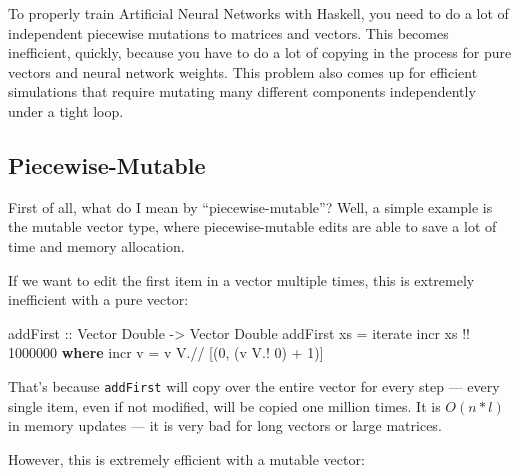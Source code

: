 \documentclass[]{article}
\newenvironment{Shaded}{}{}
\newcommand{\DataTypeTok}[1]{\textcolor[rgb]{0.56,0.13,0.00}{#1}}
\newcommand{\DecValTok}[1]{\textcolor[rgb]{0.25,0.63,0.44}{#1}}
\newcommand{\FunctionTok}[1]{\textcolor[rgb]{0.02,0.16,0.49}{#1}}
\newcommand{\KeywordTok}[1]{\textcolor[rgb]{0.00,0.44,0.13}{\textbf{#1}}}
\newcommand{\NormalTok}[1]{#1}
\newcommand{\OperatorTok}[1]{\textcolor[rgb]{0.40,0.40,0.40}{#1}}
\newcommand{\OtherTok}[1]{\textcolor[rgb]{0.00,0.44,0.13}{#1}}
\begin{document}
To properly train Artificial Neural Networks with Haskell, you need to do a lot
of independent piecewise mutations to matrices and vectors. This becomes
inefficient, quickly, because you have to do a lot of copying in the process for
pure vectors and neural network weights. This problem also comes up for
efficient simulations that require mutating many different components
independently under a tight loop.

\hypertarget{piecewise-mutable}{%
\subsection{Piecewise-Mutable}\label{piecewise-mutable}}

First of all, what do I mean by ``piecewise-mutable''? Well, a simple example is
the mutable vector type, where piecewise-mutable edits are able to save a lot of
time and memory allocation.

If we want to edit the first item in a vector multiple times, this is extremely
inefficient with a pure vector:

\begin{Shaded}
\begin{Highlighting}[]
\OtherTok{addFirst ::} \DataTypeTok{Vector} \DataTypeTok{Double} \OtherTok{{-}>} \DataTypeTok{Vector} \DataTypeTok{Double}
\NormalTok{addFirst xs }\OtherTok{=} \FunctionTok{iterate}\NormalTok{ incr xs }\OperatorTok{!!} \DecValTok{1000000}
  \KeywordTok{where}
\NormalTok{    incr v }\OtherTok{=}\NormalTok{ v }\OperatorTok{V.//}\NormalTok{ [(}\DecValTok{0}\NormalTok{, (v }\OperatorTok{V.!} \DecValTok{0}\NormalTok{) }\OperatorTok{+} \DecValTok{1}\NormalTok{)]}
\end{Highlighting}
\end{Shaded}

That's because \texttt{addFirst} will copy over the entire vector for every step
--- every single item, even if not modified, will be copied one million times.
It is \(O(n*l)\) in memory updates --- it is very bad for long vectors or large
matrices.

However, this is extremely efficient with a mutable vector:

\begin{Shaded}
\end{Shaded}
\end{document}
